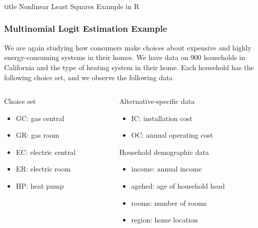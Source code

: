 \documentclass{beamer}\usepackage[]{graphicx}\usepackage[]{color}
\begin{document}
\begin{frame}\frametitle{}
    \vfill
    \centering
    \begin{beamercolorbox}[center]{title}
        \Large Nonlinear Least Squares Example in R
    \end{beamercolorbox}
    \vfill
\end{frame}

\begin{frame}\frametitle{Multinomial Logit Estimation Example}
    We are again studying how consumers make choices about expensive and highly energy-consuming systems in their homes. We have data on 900 households in California and the type of heating system in their home. Each household has the following choice set, and we observe the following data \\
    \vspace{3ex}
    \begin{columns}
    	\begin{column}{0.5\textwidth}
		    Choice set
		    \begin{itemize}
		    	\item GC: gas central
		    	\item GR: gas room
		    	\item EC: electric central
		    	\item ER: electric room
		    	\item HP: heat pump
		    \end{itemize}
		    \vspace{8ex}
	    \end{column}
	    \begin{column}{0.5\textwidth}
		    Alternative-specific data
		    \begin{itemize}
		    	\item IC: installation cost
		    	\item OC: annual operating cost
		    \end{itemize}
		    \vspace{2ex}
		    Household demographic data
		    \begin{itemize}
		    	\item income: annual income
		    	\item agehed: age of household head
		    	\item rooms: number of rooms
                \item region: home location
		    \end{itemize}
		\end{column}
    \end{columns}
\end{frame}
\end{document}
